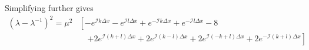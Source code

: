 Simplifying further gives
\begin{equation*}
    \begin{split}
    \left(\lambda - \lambda^{-1}\right)^2 = \mu^2&\left[  -e^{\mathcal{I}k \Delta x}-e^{\mathcal{I}l \Delta x}+e^{-\mathcal{I}k \Delta x}+e^{-\mathcal{I}l \Delta x}-8  \right.\\
    &\quad \left. +2e^{\mathcal{I}(k+l) \Delta x}
     + 2e^{\mathcal{I}(k-l) \Delta x} 
     +2e^{\mathcal{I}(-k+l) \Delta x}  
     +2e^{-\mathcal{I}(k+l) \Delta x} 
     \right]
     \end{split}
\end{equation*}
